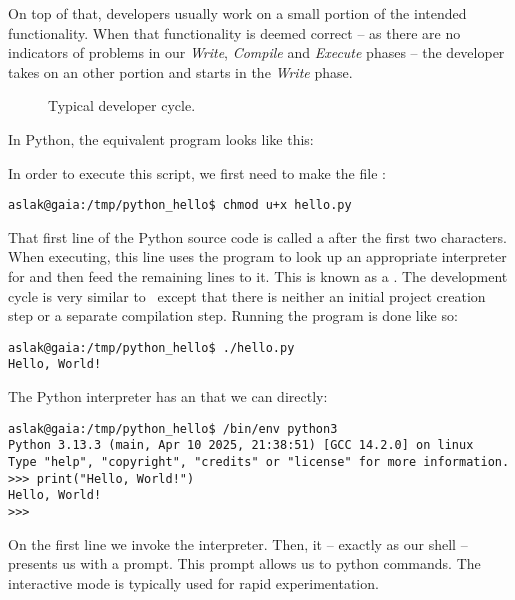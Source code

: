 On top of that, developers usually work on a small portion of the intended functionality. When that functionality is deemed correct -- as there are no indicators of problems in our \textsl{Write}, \textsl{Compile} and \textsl{Execute} phases -- the developer takes on an other portion and starts in the \textsl{Write} phase.

\begin{figure}[tbp]
  
  \caption{Typical developer cycle.}
  \label{fig:first:phases:cycle}
\end{figure}

\label{sec:first:python}

In Python, the equivalent program looks like this:


In order to execute this script, we first need to make the file :
\begin{verbatim}
aslak@gaia:/tmp/python_hello$ chmod u+x hello.py
\end{verbatim}

That first line of the Python source code is called a  after the first two characters. When executing, this line uses the  program to look up an appropriate interpreter for  and then feed the remaining lines to it. This is known as a . The development cycle is very similar to \csharp\ except that there is neither an initial project creation step or a separate compilation step. Running the program is done like so:

\begin{verbatim}
aslak@gaia:/tmp/python_hello$ ./hello.py
Hello, World!
\end{verbatim}

The Python interpreter has an  that we can  directly:

\begin{verbatim}
aslak@gaia:/tmp/python_hello$ /bin/env python3
Python 3.13.3 (main, Apr 10 2025, 21:38:51) [GCC 14.2.0] on linux
Type "help", "copyright", "credits" or "license" for more information.
>>> print("Hello, World!")
Hello, World!
>>> 
\end{verbatim}

On the first line we invoke the interpreter. Then, it -- exactly as our shell -- presents us with a prompt. This prompt allows us to  python commands. The interactive mode is typically used for rapid experimentation.


